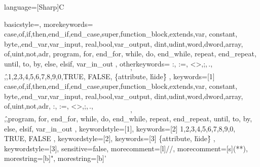  {language=[Sharp]C} %


  {
    basicstyle=\footnotesize\ttfamily,
    morekeywords={
        case,of,if,then,end_if,end_case,super,function_block,extends,var,
        constant, byte,,end_var,var_input, real,bool,var_output,
        dint,udint,word,dword,array, of,uint,not,adr, program, for, end_for, while, do, end_while, repeat, end_repeat, until, to, by, else, elsif, var_in_out
      },
    otherkeywords={
        :, :=, <>,;,\,.,\[,\],\^,1,2,3,4,5,6,7,8,9,0,TRUE, FALSE, \{attribute,  \'hide\'\}
      },
    keywords=[1]{
        case,of,if,then,end_if,end_case,super,function_block,extends,var,
        constant, byte,,end_var,var_input, real,bool,var_output,
        dint,udint,word,dword,array, of,uint,not,adr, :, :=, <>,;,\,.,\[,\],\^,program, for, end_for, while, do, end_while, repeat, end_repeat, until, to, by, else, elsif, var_in_out
      },
    keywordstyle=[1]\color{blue},
    keywords=[2]{
        1,2,3,4,5,6,7,8,9,0, TRUE, FALSE
      },
    keywordstyle=[2]\color{codepurple},
    keywords=[3]{
        \{attribute,  \'hide\'\}
      },
    keywordstyle=[3]\color{codegray},
    sensitive=false,
    morecomment=[l]{//},
    morecomment=[s]{(*}{*)},
    morestring=[b]{"},
    morestring=[b]{'}
  }



